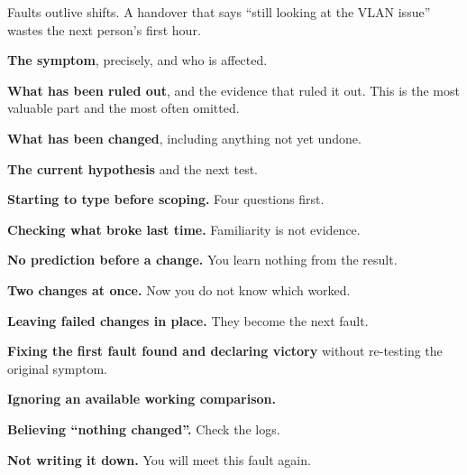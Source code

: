 Faults outlive shifts. A handover that says ``still looking at the VLAN issue''
wastes the next person's first hour.

\begin{tight}
  \item \textbf{The symptom}, precisely, and who is affected.
  \item \textbf{What has been ruled out}, and the evidence that ruled it out.
        This is the most valuable part and the most often omitted.
  \item \textbf{What has been changed}, including anything not yet undone.
  \item \textbf{The current hypothesis} and the next test.
\end{tight}

\begin{pitfall}
\begin{tight}
  \item \textbf{Starting to type before scoping.} Four questions first.
  \item \textbf{Checking what broke last time.} Familiarity is not evidence.
  \item \textbf{No prediction before a change.} You learn nothing from the
        result.
  \item \textbf{Two changes at once.} Now you do not know which worked.
  \item \textbf{Leaving failed changes in place.} They become the next fault.
  \item \textbf{Fixing the first fault found and declaring victory} without
        re-testing the original symptom.
  \item \textbf{Ignoring an available working comparison.}
  \item \textbf{Believing ``nothing changed''.} Check the logs.
  \item \textbf{Not writing it down.} You will meet this fault again.
\end{tight}
\end{pitfall}

